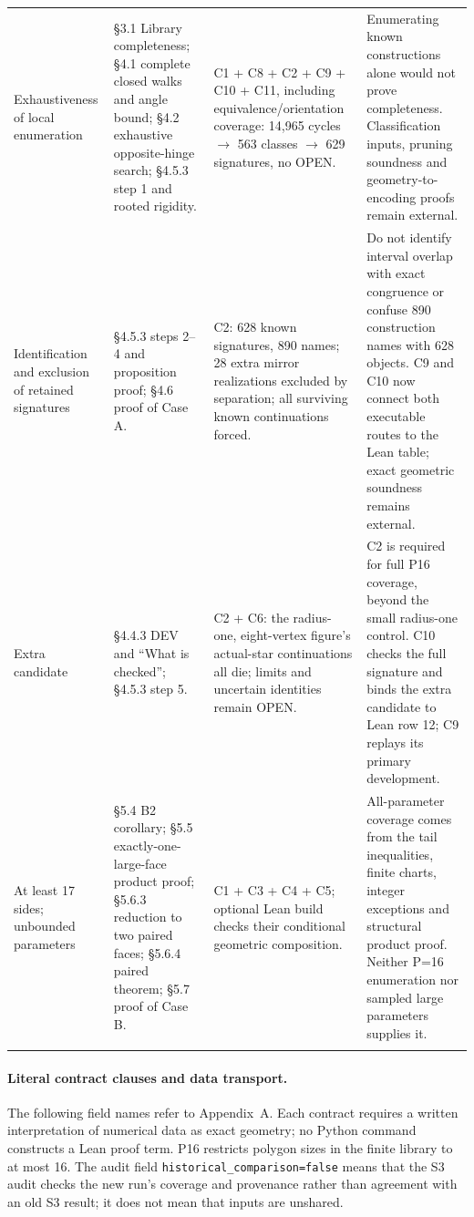 \documentclass[11pt]{article}
\theoremstyle{definition}
\theoremstyle{remark}
\begin{document}
\begin{longtable}{@{}>{\raggedright\arraybackslash}p{}>{\raggedright\arraybackslash}p{}>{\raggedright\arraybackslash}p{}>{\raggedright\arraybackslash}p{}@{}}
Exhaus\-tiveness of local enumeration & §3.1 Library completeness; §4.1 complete closed walks and angle bound; §4.2 exhaustive opposite-hinge search; §4.5.3 step 1 and rooted rigidity. & C1 + C8 + C2 + C9 + C10 + C11, including equivalence/orientation coverage: 14,965 cycles $\to$ 563 classes $\to$ 629 signatures, no OPEN. & Enumerating known constructions alone would not prove completeness. Classification inputs, pruning soundness and geometry-to-encoding proofs remain external.\\\addlinespace
Identifi\-cation and exclusion of retained signatures & §4.5.3 steps 2–4 and proposition proof; §4.6 proof of Case A. & C2: 628 known signatures, 890 names; 28 extra mirror realizations excluded by separation; all surviving known continuations forced. & Do not identify interval overlap with exact congruence or confuse 890 construction names with 628 objects. C9 and C10 now connect both executable routes to the Lean table; exact geometric soundness remains external.\\\addlinespace
Extra candidate & §4.4.3 DEV and “What is checked”; §4.5.3 step 5. & C2 + C6: the radius-one, eight-vertex figure's actual-star continuations all die; limits and uncertain identities remain OPEN. & C2 is required for full P16 coverage, beyond the small radius-one control. C10 checks the full signature and binds the extra candidate to Lean row 12; C9 replays its primary development.\\\addlinespace
At least 17 sides; unbounded parameters & §5.4 B2 corollary; §5.5 exactly-one-large-face product proof; §5.6.3 reduction to two paired faces; §5.6.4 paired theorem; §5.7 proof of Case B. & C1 + C3 + C4 + C5; optional Lean build checks their conditional geometric composition. & All-parameter coverage comes from the tail inequalities, finite charts, integer exceptions and structural product proof. Neither P=16 enumeration nor sampled large parameters supplies it.\\\addlinespace
\bottomrule
\end{longtable}
\endgroup

\paragraph{Literal contract clauses and data transport.}
The following field names refer to Appendix~A. Each contract requires a
written interpretation of numerical data as exact geometry; no Python
command constructs a Lean proof term. P16 restricts polygon sizes in the
finite library to at most 16. The audit field
\texttt{historical\_comparison=false} means that the S3 audit checks the
new run's coverage and provenance rather than agreement with an old S3
result; it does not mean that inputs are unshared.
\end{document}
